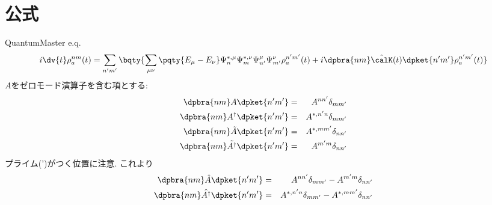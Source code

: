 \documentclass[10.5pt,a4paper]{jreport}
\begin{document}
\section{公式}
QuantumMaster e.q.
\begin{eqnarray}
  i\dv{t}\rho_a^{nm}(t) = \sum_{n'm'}\bqty{\sum_{\mu\nu}\pqty{E_\mu - E_\nu}\Psi_{n}^{*, \mu}\Psi_{m}^{*, \nu}\Psi_{n'}^{\mu}\Psi_{m'}^{\nu}\rho_a^{n'm'}(t) + i\dpbra{nm}\hat{\calK}(t)\dpket{n'm'}\rho_a^{n'm'}(t)}
\end{eqnarray}
$A$をゼロモード演算子を含む項とする:
\begin{eqnarray}
  \dpbra{nm}A\dpket{n'm'} &=& A^{nn'}\delta_{mm'}\\
  \dpbra{nm}A^\dagger\dpket{n'm'} &=& A^{*, n'n}\delta_{mm'}\\
  \dpbra{nm}\tilde{A}\dpket{n'm'} &=& A^{*, mm'}\delta_{nn'}\\
  \dpbra{nm}\tilde{A^\dagger}\dpket{n'm'} &=& A^{m'm}\delta_{nn'}\\
\end{eqnarray}
プライム(')がつく位置に注意. これより
\begin{eqnarray}
  \dpbra{nm}\hat{A}\dpket{n'm'} &=& A^{nn'}\delta_{mm'} - A^{m'm}\delta_{nn'}\\
  \dpbra{nm}\hat{A^\dagger}\dpket{n'm'} &=& A^{*, n'n}\delta_{mm'} - A^{*, mm'}\delta_{nn'}
\end{eqnarray}
\end{document}

